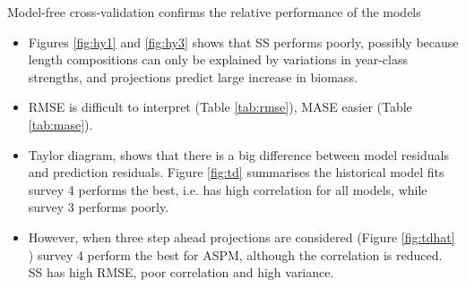 \documentclass[a4paper]{article}
\begin{document}
\begin{description}
\begin{description}
     \item{Model-free cross-validation} confirms the relative performance of the models
    \begin{itemize}
        \item Figures \ref{fig:hy1} and \ref{fig:hy3} shows that SS performs poorly, possibly because length compositions can only be explained by variations in year-class strengths, and projections predict large increase in biomass.
        \item RMSE is difficult to interpret (Table \ref{tab:rmse}), MASE easier (Table \ref{tab:mase}).
        \item Taylor diagram, shows that there is a big difference between model residuals and prediction residuals. Figure \ref{fig:td} summarises the historical model fits survey 4 performs the best, i.e. has high correlation for all models, while survey 3 performs poorly.
        \item However, when three step ahead projections are considered (Figure \ref{fig:tdhat} ) survey 4 perform the best for ASPM, although the correlation is reduced. SS has high RMSE, poor correlation and high  variance.  
   \end{itemize}
 \end{description}



\end{description}
\end{document}
